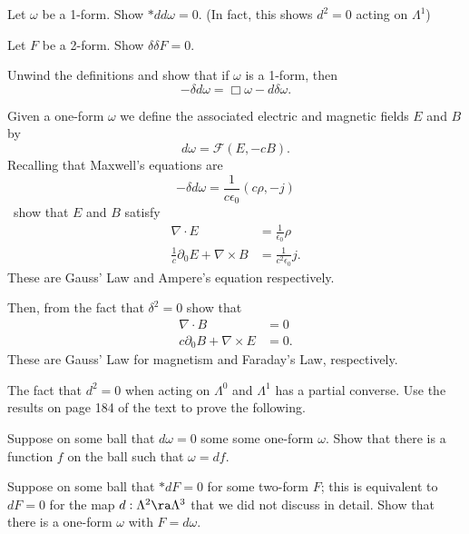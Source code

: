 \documentclass[minion]{homework}
\begin{document}
\begin{aproblems}
\begin{subproblems}
\item Let $\omega$ be a 1-form.  Show $*dd\omega=0$.  (In fact, this shows $d^2=0
$ acting on $\Lambda^1$)
\item Let $F$ be a 2-form.  Show $\delta\delta F=0$.
\item Unwind the definitions and show that if $\omega$ is a 1-form, then
\begin{equation}
-\delta d \omega = \Box \omega - d\delta \omega.
\end{equation}
\end{subproblems}

\hproblem
Given a one-form $\omega$ we define the associated electric and magnetic
fields $E$ and $B$ by
\[
d\omega = \mathcal{F}(E,-cB).
\]
Recalling that Maxwell's equations are
\[
-\delta d\omega = \frac{1}{c\epsilon_0}(c\rho,-j)
\]
\
show that $E$ and $B$ satisfy
\begin{align}
\nabla\cdot E &= \frac{1}{\epsilon_0} \rho\\
\frac{1}{c}\partial_0 E + \nabla\times B &= \frac{1}{c^2\epsilon_0} j.
\end{align}
These are Gauss' Law and Ampere's equation respectively.

Then, from the fact that $\delta^2=0$ show that
\begin{align}
\nabla \cdot B &= 0\\
c\partial_0 B + \nabla\times E &= 0.
\end{align}
These are Gauss' Law for magnetism and Faraday's Law, respectively.

\hproblem  The fact that $d^2=0$ when acting on $\Lambda^0$ and $\Lambda^1$ 
has a partial converse.
Use the results on page 184 of the text to prove the following.
\begin{subproblems}
\item Suppose on some ball that $d\omega=0$ some some one-form $\omega$.  Show that there is a function $f$ on the ball
such that $\omega=df$.
\item Suppose on some ball that $*dF=0$ for some two-form $F$; this is equivalent to $dF=0$
for the map $d:\Lambda^2\ra\Lambda^3$ that we did not discuss in detail.  Show that there is a 
one-form $\omega$ with $F=d\omega$.
\end{subproblems}


\end{aproblems}
\end{document}

